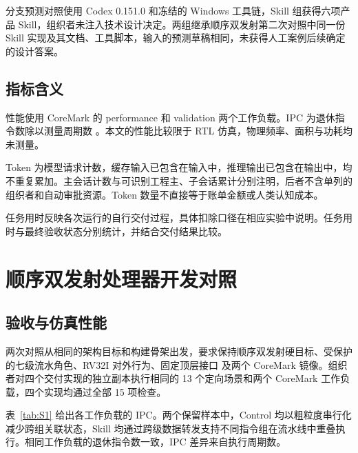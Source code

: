 \documentclass[UTF8,fontset=none,zihao=-4,a4paper]{ctexart}
\begin{document}
分支预测对照使用 Codex 0.151.0 和冻结的 Windows 工具链，Skill 组获得六项产品 Skill，组织者未注入技术设计决定。两组继承顺序双发射第二次对照中同一份 Skill 实现及其文档、工具脚本，输入的预测草稿相同，未获得人工案例后续确定的设计答案。

\subsection{指标含义}

性能使用 CoreMark 的 performance 和 validation 两个工作负载。IPC 为退休指令数除以测量周期数 。本文的性能比较限于 RTL 仿真，物理频率、面积与功耗均未测量。

Token 为模型请求计数，缓存输入已包含在输入中，推理输出已包含在输出中，均不重复累加。主会话计数与可识别工程主、子会话累计分别注明，后者不含单列的组织者和自动审批资源。Token 数量不直接等于账单金额或人类认知成本。

任务用时反映各次运行的自行交付过程，具体扣除口径在相应实验中说明。任务用时与最终验收状态分别统计，并结合交付结果比较。

\section{顺序双发射处理器开发对照}

\subsection{验收与仿真性能}

两次对照从相同的架构目标和构建骨架出发，要求保持顺序双发射硬目标、受保护的七级流水角色、RV32I 对外行为、固定顶层接口  及两个 CoreMark 镜像。组织者对四个交付实现的独立副本执行相同的 13 个定向场景和两个 CoreMark 工作负载，四个实现均通过全部 15 项检查。

表~\ref{tab:S1} 给出各工作负载的 IPC。两个保留样本中，Control 均以粗粒度串行化减少跨组关联状态，Skill 均通过跨级数据转发支持不同指令组在流水线中重叠执行。相同工作负载的退休指令数一致，IPC 差异来自执行周期数。
\end{document}
